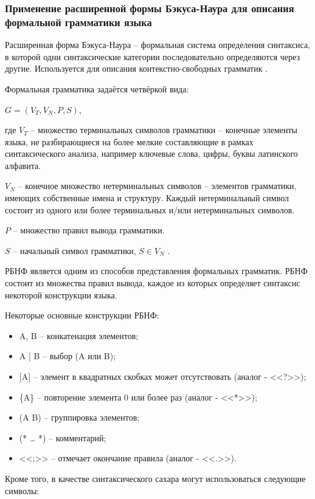 \subsubsection{Применение расширенной формы Бэкуса-Наура для описания формальной грамматики языка}

Расширенная форма Бэкуса-Наура – формальная система определения синтаксиса,
в которой одни синтаксические категории последовательно определяются через другие.
Используется для описания контекстно-свободных грамматик .

Формальная грамматика задаётся четвёркой вида:

\(G = (V_T, V_N, P, S)\),

где \(V_T\) -- множество терминальных символов грамматики – конечные
элементы языка, не разбирающиеся на более мелкие составляющие в рамках
синтаксического анализа, например ключевые слова, цифры, буквы
латинского алфавита.

\(V_N\) -- конечное множество нетерминальных символов – элементов грамматики, имеющих собственные имена и структуру.
Каждый нетерминальный символ состоит из одного или более терминальных и/или нетерминальных символов.

\(P\) -- множество правил вывода грамматики.

\(S\) -- начальный символ грамматики, \(S \in V_N\) .

РБНФ является одним из способов представления формальных грамматик.
РБНФ состоит из множества правил вывода, каждое из которых определяет синтаксис некоторой конструкции языка.

Некоторые основные конструкции РБНФ:

\begin{itemize}
    \item A, B -- конкатенация элементов;
    \item A | B -- выбор (A или B);
    \item {[A]} -- элемент в квадратных скобках может отсутствовать (аналог - <<?>>);
    \item \{A\} -- повторение элемента 0 или более раз (аналог - <<*>>);
    \item (A B) -- группировка элементов;
    \item (* … *) – комментарий;
    \item <<;>> – отмечает окончание правила (аналог - <<.>>).
\end{itemize}

Кроме того, в качестве синтаксического сахара могут использоваться следующие символы:

